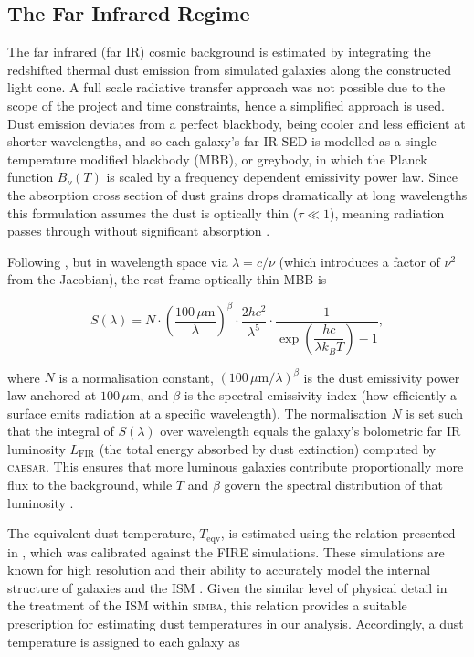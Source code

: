 \documentclass[
    a4paper, %
    10pt, %
    unnumberedsections, %
]{LTJournalArticle}
\begin{document}
\subsection{The Far Infrared Regime}

The far infrared (far IR) cosmic background is estimated by integrating the redshifted thermal dust emission from simulated galaxies along the constructed light cone. A full scale radiative transfer approach was not possible due to the scope of the project and time constraints, hence a simplified approach is used. Dust emission deviates from a perfect blackbody, being cooler and less efficient at shorter wavelengths, and so each galaxy's far IR SED is modelled as a single temperature modified blackbody (MBB), or greybody, in which the Planck function $B_\nu(T)$ is scaled by a frequency dependent emissivity power law. Since the absorption cross section of dust grains drops dramatically at long wavelengths this formulation assumes the dust is optically thin ($\tau \ll 1$), meaning radiation passes through without significant absorption \parencite{hildebrandDeterminationCloudMasses1983}.

Following \cite{caseyFarinfraredSpectralEnergy2012}, but in wavelength space via $\lambda = c/\nu$ (which introduces a factor of $\nu^2$ from the Jacobian), the rest frame optically thin MBB is

\begin{equation}
    S(\lambda) = N \cdot \left(\frac{100\,\mu\mathrm{m}}{\lambda}\right)^{\!\beta} 
    \cdot \frac{2hc^2}{\lambda^5} \cdot \frac{1}{\exp\!\left(\dfrac{hc}{\lambda k_B T}
    \right) - 1},
    \label{eq:dustmbb}
\end{equation}

\noindent where $N$ is a normalisation constant, $\left(100\,\mu\mathrm{m}/\lambda\right)^\beta$ is the dust emissivity power law anchored at $100\,\mu\mathrm{m}$, and $\beta$ is the spectral emissivity index (how efficiently a surface emits radiation at a specific wavelength). The normalisation $N$ is set such that the integral of $S(\lambda)$ over wavelength equals the galaxy's bolometric far IR luminosity $L_\mathrm{FIR}$ (the total energy absorbed by dust extinction) computed by \textsc{caesar}. This ensures that more luminous galaxies contribute proportionally more flux to the background, while $T$ and $\beta$ govern the spectral distribution of that luminosity \parencite{caseyFarinfraredSpectralEnergy2012}.

The equivalent dust temperature, $T_\mathrm{eqv}$, is estimated using the relation presented in \cite{liangDustTemperaturesHighredshift2019}, which was calibrated against the \textsc{FIRE} simulations. These simulations are known for high resolution and their ability to accurately model the internal structure of galaxies and the ISM \parencite{feldmannAreStarFormation2017}. Given the similar level of physical detail in the treatment of the ISM within \textsc{simba}, this relation provides a suitable prescription for estimating dust temperatures in our analysis. Accordingly, a dust temperature is assigned to each galaxy as
\end{document}
